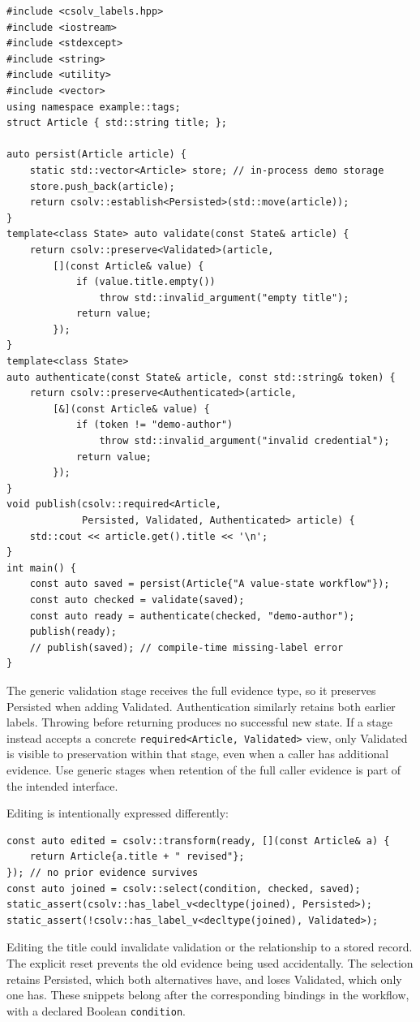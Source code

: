 \documentclass[11pt]{article}
\begin{document}
\begin{lstlisting}
#include <csolv_labels.hpp>
#include <iostream>
#include <stdexcept>
#include <string>
#include <utility>
#include <vector>
using namespace example::tags;
struct Article { std::string title; };

auto persist(Article article) {
    static std::vector<Article> store; // in-process demo storage
    store.push_back(article);
    return csolv::establish<Persisted>(std::move(article));
}
template<class State> auto validate(const State& article) {
    return csolv::preserve<Validated>(article,
        [](const Article& value) {
            if (value.title.empty())
                throw std::invalid_argument("empty title");
            return value;
        });
}
template<class State>
auto authenticate(const State& article, const std::string& token) {
    return csolv::preserve<Authenticated>(article,
        [&](const Article& value) {
            if (token != "demo-author")
                throw std::invalid_argument("invalid credential");
            return value;
        });
}
void publish(csolv::required<Article,
             Persisted, Validated, Authenticated> article) {
    std::cout << article.get().title << '\n';
}
int main() {
    const auto saved = persist(Article{"A value-state workflow"});
    const auto checked = validate(saved);
    const auto ready = authenticate(checked, "demo-author");
    publish(ready);
    // publish(saved); // compile-time missing-label error
}
\end{lstlisting}

The generic validation stage receives the full evidence type, so it preserves
Persisted when adding Validated. Authentication similarly retains both earlier
labels. Throwing before returning produces no successful new state. If a
stage instead accepts a concrete \texttt{required<Article, Validated>} view,
only Validated is visible to preservation within that stage, even when a
caller has additional evidence. Use generic stages when retention of the full
caller evidence is part of the intended interface.

Editing is intentionally expressed differently:
\begin{lstlisting}
const auto edited = csolv::transform(ready, [](const Article& a) {
    return Article{a.title + " revised"};
}); // no prior evidence survives
const auto joined = csolv::select(condition, checked, saved);
static_assert(csolv::has_label_v<decltype(joined), Persisted>);
static_assert(!csolv::has_label_v<decltype(joined), Validated>);
\end{lstlisting}
Editing the title could invalidate validation or the relationship to a stored
record. The explicit reset prevents the old evidence being used accidentally.
The selection retains Persisted, which both alternatives have, and loses
Validated, which only one has. These snippets belong after the corresponding
bindings in the workflow, with a declared Boolean \texttt{condition}.
\end{document}
